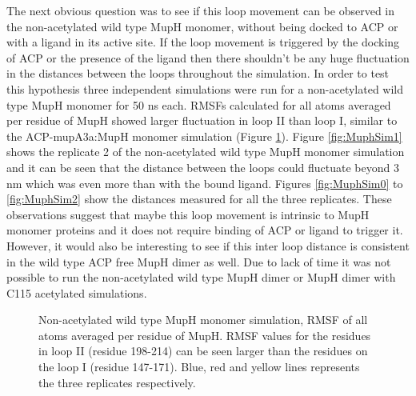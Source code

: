 \newpage
	The next obvious question was to see if this loop movement can be observed in the non-acetylated wild type MupH monomer, without being docked to ACP or with a ligand in its active site. If the loop movement is triggered by the docking of ACP or the presence of the ligand then there shouldn't be any huge fluctuation in the distances between the loops throughout the simulation. In order to test this hypothesis three independent simulations were run for a non-acetylated wild type MupH monomer for 50 ns each. RMSFs calculated for all atoms averaged per residue of MupH showed larger fluctuation in loop II than loop I, similar to the ACP-mupA3a:MupH monomer simulation (Figure \ref{fig:muphRmsf}). Figure \ref{fig:MuphSim1} shows the replicate 2 of the non-acetylated wild type MupH monomer simulation and it can be seen that the distance between the loops could fluctuate beyond 3 nm which was even more than with the bound ligand. Figures \ref{fig:MuphSim0} to \ref{fig:MuphSim2} show the distances measured for all the three replicates. These observations suggest that maybe this loop movement is intrinsic to MupH monomer proteins and it does not require binding of ACP or ligand to trigger it. However, it would also be interesting to see if this inter loop distance is consistent in the wild type ACP free MupH dimer as well. Due to lack of time it was not possible to run the non-acetylated wild type MupH dimer or MupH dimer with C115 acetylated simulations.		

		\setlength\fboxsep{5pt}
		\setlength\fboxrule{1.5pt}
		\begin{figure}[htbp]
		\centering
		\caption[Non-acetylated wild type MupH monomer simulation, RMSF of all atoms averaged per residue of MupH.]{Non-acetylated wild type MupH monomer simulation, RMSF of all atoms averaged per residue of MupH. RMSF values for the residues in loop II (residue 198-214) can be seen larger than the residues on the loop I (residue 147-171). Blue, red and yellow lines represents the three replicates respectively.}
		\label{fig:muphRmsf}
		\end{figure}	
		
